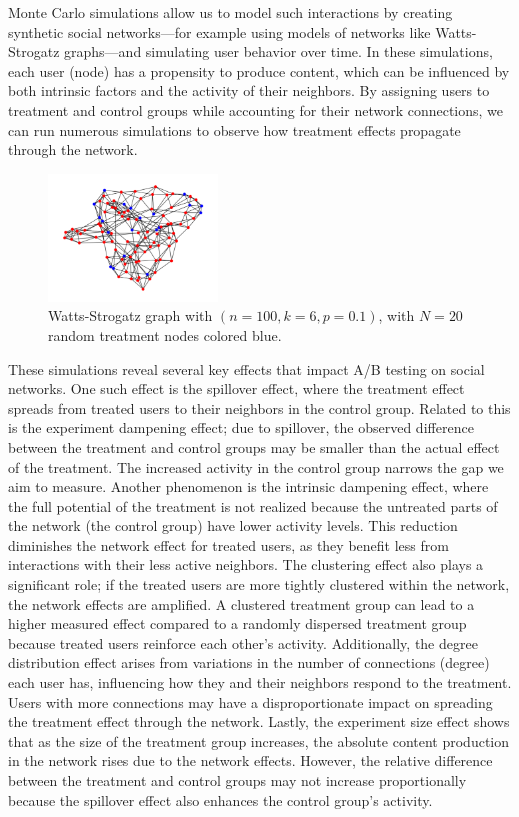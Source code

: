 \documentclass[final,5p,times,twocolumn,authoryear]{elsarticle}
\begin{document}
Monte Carlo simulations allow us to model such interactions by creating synthetic social networks—for example using models of networks like Watts-Strogatz graphs—and simulating user behavior over time. In these simulations, each user (node) has a propensity to produce content, which can be influenced by both intrinsic factors and the activity of their neighbors. By assigning users to treatment and control groups while accounting for their network connections, we can run numerous simulations to observe how treatment effects propagate through the network.

\begin{figure}[h]
	\centering 
	\includegraphics[width=0.4\textwidth]{fig-6.png}	
	\caption{Watts-Strogatz graph with $(n=100, k=6, p=0.1)$, with $N=20$ random treatment nodes colored blue.}
\end{figure}

These simulations reveal several key effects that impact A/B testing on social networks. One such effect is the spillover effect, where the treatment effect spreads from treated users to their neighbors in the control group. Related to this is the experiment dampening effect; due to spillover, the observed difference between the treatment and control groups may be smaller than the actual effect of the treatment. The increased activity in the control group narrows the gap we aim to measure. Another phenomenon is the intrinsic dampening effect, where the full potential of the treatment is not realized because the untreated parts of the network (the control group) have lower activity levels. This reduction diminishes the network effect for treated users, as they benefit less from interactions with their less active neighbors. The clustering effect also plays a significant role; if the treated users are more tightly clustered within the network, the network effects are amplified. A clustered treatment group can lead to a higher measured effect compared to a randomly dispersed treatment group because treated users reinforce each other's activity. Additionally, the degree distribution effect arises from variations in the number of connections (degree) each user has, influencing how they and their neighbors respond to the treatment. Users with more connections may have a disproportionate impact on spreading the treatment effect through the network. Lastly, the experiment size effect shows that as the size of the treatment group increases, the absolute content production in the network rises due to the network effects. However, the relative difference between the treatment and control groups may not increase proportionally because the spillover effect also enhances the control group's activity.
\end{document}
